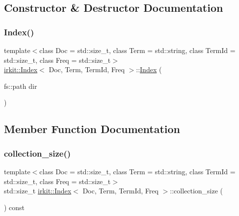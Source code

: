 \subsection{Constructor \& Destructor Documentation}
\mbox{\label{classirkit_1_1Index_a38ba1f601738f30be7d38232cd172f16}} 
\subsubsection{\texorpdfstring{Index()}{Index()}}
{\footnotesize\ttfamily template$<$class Doc  = std\+::size\+\_\+t, class Term  = std\+::string, class Term\+Id  = std\+::size\+\_\+t, class Freq  = std\+::size\+\_\+t$>$ \\
\hyperlink{classirkit_1_1Index}{irkit\+::\+Index}$<$ Doc, Term, Term\+Id, Freq $>$\+::\hyperlink{classirkit_1_1Index}{Index} (\begin{DoxyParamCaption}\item[{fs\+::path}]{dir }\end{DoxyParamCaption})\hspace{0.3cm}{\ttfamily [inline]}}



\subsection{Member Function Documentation}
\mbox{\label{classirkit_1_1Index_a45ede4e9e43c8a813d13467d97c084a1}} 
\subsubsection{\texorpdfstring{collection\+\_\+size()}{collection\_size()}}
{\footnotesize\ttfamily template$<$class Doc  = std\+::size\+\_\+t, class Term  = std\+::string, class Term\+Id  = std\+::size\+\_\+t, class Freq  = std\+::size\+\_\+t$>$ \\
std\+::size\+\_\+t \hyperlink{classirkit_1_1Index}{irkit\+::\+Index}$<$ Doc, Term, Term\+Id, Freq $>$\+::collection\+\_\+size (\begin{DoxyParamCaption}{ }\end{DoxyParamCaption}) const\hspace{0.3cm}{\ttfamily [inline]}}

